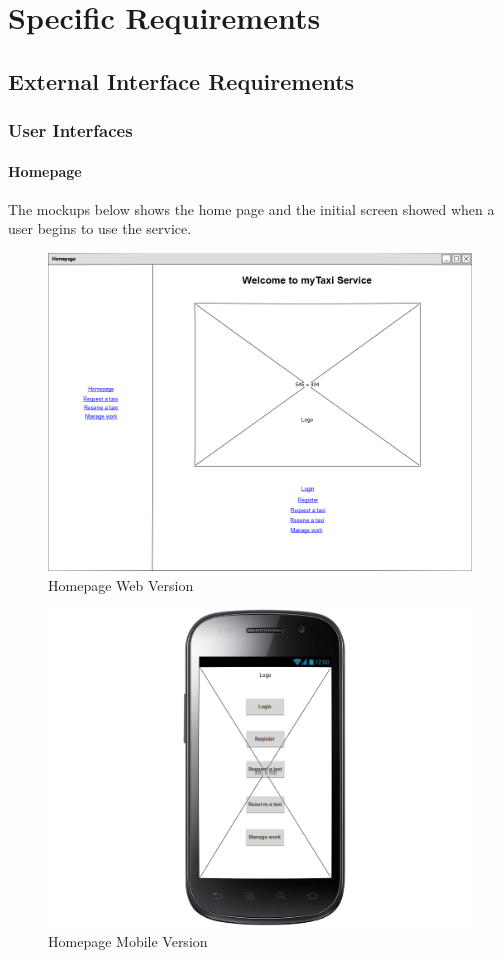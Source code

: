 \documentclass[a4paper,12pt]{article}%
\begin{document}
\section{Specific Requirements}
\subsection{External Interface Requirements}
\subsubsection{User Interfaces}
\paragraph{Homepage}
The mockups below shows the home page and the initial screen showed when a user begins to use the service.
\begin{figure}[H]
\centering
\includegraphics[scale=0.3]{mockups/homepage_web.png}
\caption{Homepage Web Version}
\end{figure}
\begin{figure}[H]
\centering
\includegraphics[scale=0.3]{mockups/homepage_mobile.png}
\caption{Homepage Mobile Version}
\end{figure}
\break
\end{document}

